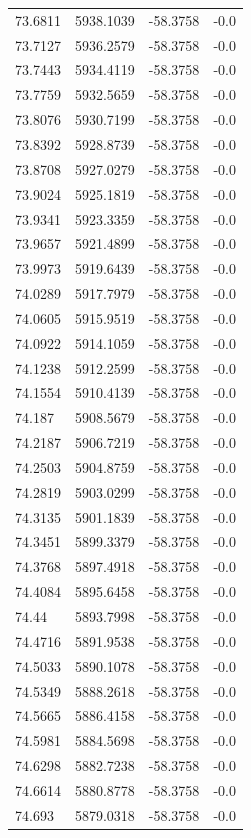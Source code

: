 \begin{table}[H]
\begin{tabular}{llll}
73.6811 & 5938.1039 & -58.3758 & -0.0 \\
73.7127 & 5936.2579 & -58.3758 & -0.0 \\
73.7443 & 5934.4119 & -58.3758 & -0.0 \\
73.7759 & 5932.5659 & -58.3758 & -0.0 \\
73.8076 & 5930.7199 & -58.3758 & -0.0 \\
73.8392 & 5928.8739 & -58.3758 & -0.0 \\
73.8708 & 5927.0279 & -58.3758 & -0.0 \\
73.9024 & 5925.1819 & -58.3758 & -0.0 \\
73.9341 & 5923.3359 & -58.3758 & -0.0 \\
73.9657 & 5921.4899 & -58.3758 & -0.0 \\
73.9973 & 5919.6439 & -58.3758 & -0.0 \\
74.0289 & 5917.7979 & -58.3758 & -0.0 \\
74.0605 & 5915.9519 & -58.3758 & -0.0 \\
74.0922 & 5914.1059 & -58.3758 & -0.0 \\
74.1238 & 5912.2599 & -58.3758 & -0.0 \\
74.1554 & 5910.4139 & -58.3758 & -0.0 \\
74.187 & 5908.5679 & -58.3758 & -0.0 \\
74.2187 & 5906.7219 & -58.3758 & -0.0 \\
74.2503 & 5904.8759 & -58.3758 & -0.0 \\
74.2819 & 5903.0299 & -58.3758 & -0.0 \\
74.3135 & 5901.1839 & -58.3758 & -0.0 \\
74.3451 & 5899.3379 & -58.3758 & -0.0 \\
74.3768 & 5897.4918 & -58.3758 & -0.0 \\
74.4084 & 5895.6458 & -58.3758 & -0.0 \\
74.44 & 5893.7998 & -58.3758 & -0.0 \\
74.4716 & 5891.9538 & -58.3758 & -0.0 \\
74.5033 & 5890.1078 & -58.3758 & -0.0 \\
74.5349 & 5888.2618 & -58.3758 & -0.0 \\
74.5665 & 5886.4158 & -58.3758 & -0.0 \\
74.5981 & 5884.5698 & -58.3758 & -0.0 \\
74.6298 & 5882.7238 & -58.3758 & -0.0 \\
74.6614 & 5880.8778 & -58.3758 & -0.0 \\
74.693 & 5879.0318 & -58.3758 & -0.0 \\

\end{tabular}
\end{table}
